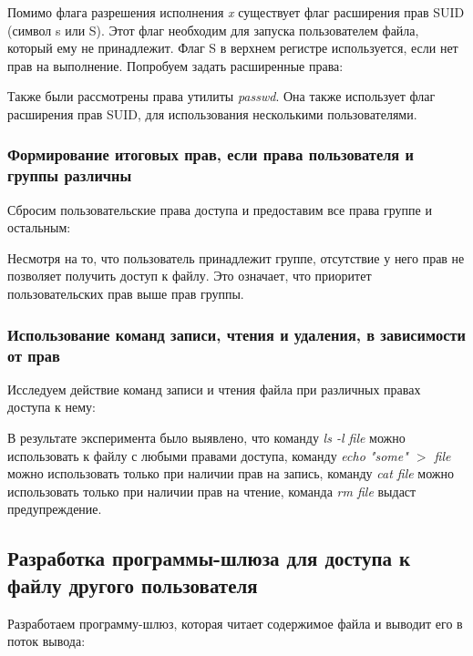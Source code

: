 \documentclass[14pt,a4paper,report]{report}
\begin{document}
Помимо флага разрешения исполнения \emph{x} существует флаг расширения прав SUID (символ s или S). Этот флаг необходим для запуска пользователем файла, который ему не принадлежит. Флаг S в верхнем регистре используется, если нет прав на выполнение. Попробуем задать расширенные права:



Также были рассмотрены права утилиты \emph{passwd}. Она также использует флаг расширения прав SUID, для использования несколькими пользователями.

\subsubsection{Формирование итоговых прав, если права пользователя и группы различны}

Сбросим пользовательские права доступа и предоставим все права группе и остальным:



Несмотря на то, что пользователь принадлежит группе, отсутствие у него прав не позволяет получить доступ к файлу. Это означает, что приоритет пользовательских прав выше прав группы.

\subsubsection{Использование команд записи, чтения и удаления, в зависимости от прав}

Исследуем действие команд записи и чтения файла при различных правах доступа к нему:



В результате эксперимента было выявлено, что команду \emph{ls -l file} можно использовать к файлу с любыми правами доступа, команду \emph{echo "some" $>$ file} можно использовать только при наличии прав на запись, команду  \emph{cat file} можно использовать только при наличии прав на чтение, команда \emph{rm file} выдаст предупреждение.

\subsection{Разработка программы-шлюза для доступа к файлу другого пользователя}

Разработаем программу-шлюз, которая читает содержимое файла и выводит его в поток вывода:


\end{document}

